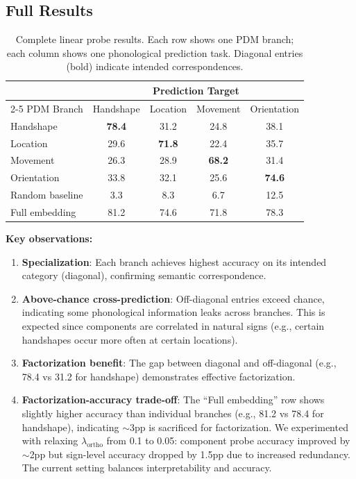 \documentclass{article}
\theoremstyle{definition}
\theoremstyle{remark}
\begin{document}
\subsection{Full Results}

\begin{table}[ht]
\caption{Complete linear probe results. Each row shows one PDM branch; each column shows one phonological prediction task. Diagonal entries (bold) indicate intended correspondences.}
\label{tab:full_probe}
\vspace{-1mm}
\begin{center}
\begin{small}
\begin{tabular*}{\columnwidth}{@{\extracolsep{\fill}}lcccc@{}}
\toprule
& \multicolumn{4}{c}{Prediction Target} \\
\cmidrule(lr){2-5}
PDM Branch & Handshape & Location & Movement & Orientation \\
\midrule
Handshape & \textbf{78.4} & 31.2 & 24.8 & 38.1 \\
Location & 29.6 & \textbf{71.8} & 22.4 & 35.7 \\
Movement & 26.3 & 28.9 & \textbf{68.2} & 31.4 \\
Orientation & 33.8 & 32.1 & 25.6 & \textbf{74.6} \\
\midrule
Random baseline & 3.3 & 8.3 & 6.7 & 12.5 \\
Full embedding & 81.2 & 74.6 & 71.8 & 78.3 \\
\bottomrule
\end{tabular*}
\end{small}
\end{center}
\vspace{-2mm}
\end{table}

\textbf{Key observations:}
\begin{enumerate}[nosep,topsep=2pt]
\item \textbf{Specialization}: Each branch achieves highest accuracy on its intended category (diagonal), confirming semantic correspondence.
\item \textbf{Above-chance cross-prediction}: Off-diagonal entries exceed chance, indicating some phonological information leaks across branches. This is expected since components are correlated in natural signs (e.g., certain handshapes occur more often at certain locations).
\item \textbf{Factorization benefit}: The gap between diagonal and off-diagonal (e.g., 78.4 vs 31.2 for handshape) demonstrates effective factorization.
\item \textbf{Factorization-accuracy trade-off}: The ``Full embedding'' row shows slightly higher accuracy than individual branches (e.g., 81.2 vs 78.4 for handshape), indicating $\sim$3pp is sacrificed for factorization. We experimented with relaxing $\lambda_{\text{ortho}}$ from 0.1 to 0.05: component probe accuracy improved by $\sim$2pp but sign-level accuracy dropped by 1.5pp due to increased redundancy. The current setting balances interpretability and accuracy.
\end{enumerate}
\end{document}
